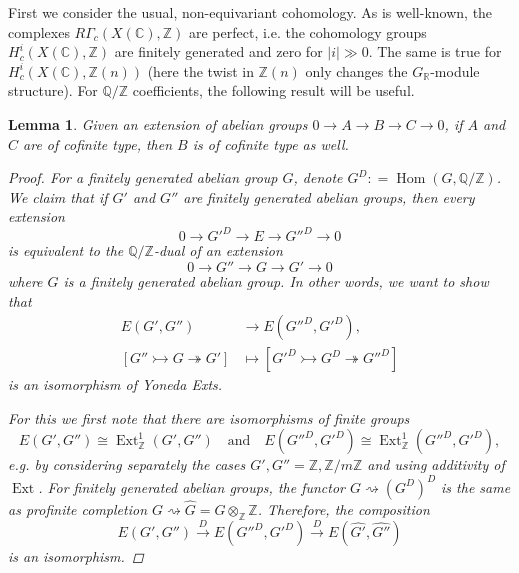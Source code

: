 \documentclass[leqno,12pt]{article}
\theoremstyle{plain}
\newtheorem{lemma}[theorem]{\indent\sc Lemma}
\theoremstyle{definition}
\DeclareMathOperator{\Hom}{Hom}
\DeclareMathOperator{\Ext}{Ext}
\newcommand{\ZZ}{\mathbb{Z}}
\newcommand{\QQ}{\mathbb{Q}}
\newcommand{\RR}{\mathbb{R}}
\newcommand{\CC}{\mathbb{C}}
\newcommand{\dfn}{\mathrel{\mathop:}=}
\begin{document}
First we consider the usual, non-equivariant cohomology. As is well-known, the
complexes $R\Gamma_c (X (\CC), \ZZ)$ are perfect, i.e. the cohomology groups
$H^i_c (X (\CC), \ZZ)$ are finitely generated and zero for $|i| \gg 0$.  The
same is true for $H^i_c (X (\CC), \ZZ (n))$ (here the twist in $\ZZ (n)$ only
changes the $G_\RR$-module structure). For $\QQ/\ZZ$ coefficients, the following
result will be useful.

\begin{lemma}
  \label{lemma:extensions-of-cofinite-type-groups}
  Given an extension of abelian groups
  $0 \to A \to B \to C \to 0$,
  if $A$ and $C$ are of cofinite type, then $B$ is of cofinite type as well.

  \begin{proof}
    For a finitely generated abelian group $G$, denote
    $G^D \dfn \Hom (G, \QQ/\ZZ)$.  We claim that if $G'$ and $G''$ are finitely
    generated abelian groups, then every extension
    $$0 \to G'^D \to E \to G''^D \to 0$$
    is equivalent to the $\QQ/\ZZ$-dual of an extension
    $$0 \to G'' \to G \to G' \to 0$$
    where $G$ is a finitely generated abelian group. In other words,
    we want to show that
    \begin{align*}
      E (G',G'') & \to E (G''^D,G'^D),\\
      [G'' \rightarrowtail G \twoheadrightarrow G'] & \mapsto
      [G'^D \rightarrowtail G^D \twoheadrightarrow G''^D]
    \end{align*}
    is an isomorphism of Yoneda Exts.

    For this we first note that there are isomorphisms of finite groups
    \[ E (G',G'') \cong \Ext_\ZZ^1 (G',G'')
      \quad\text{and}\quad
      E (G''^D, G'^D) \cong \Ext_\ZZ^1 (G''^D, G'^D), \]
    e.g. by considering separately the cases $G', G'' = \ZZ, \ZZ/m\ZZ$ and using
    additivity of $\Ext$. For finitely generated abelian groups, the functor
    $G \rightsquigarrow (G^D)^D$ is the same as profinite completion
    $G \rightsquigarrow \widehat{G} = G\otimes_\ZZ \widehat{\ZZ}$. Therefore,
    the composition
    \[ E (G',G'') \xrightarrow{D}
    E (G''^D,G'^D) \xrightarrow{D}
    E (\widehat{G'},\widehat{G''}) \]
    is an isomorphism.
  \end{proof}
\end{lemma}
\end{document}
